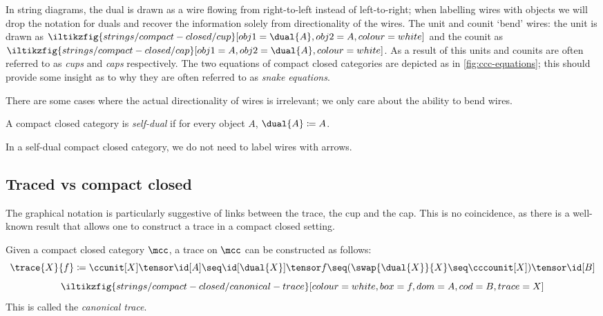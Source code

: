 In string diagrams, the dual is drawn as a wire flowing from right-to-left
instead of left-to-right; when labelling wires with objects we will drop the
notation for duals and recover the information solely from directionality of the
wires.
The unit and counit `bend' wires: the unit is drawn as \(
\iltikzfig{strings/compact-closed/cup}[obj1=\dual{A},obj2=A,colour=white]
\)
 and the counit as \(
\iltikzfig{strings/compact-closed/cap}[obj1=A,obj2=\dual{A},colour=white]
\).
As a result of this units and counits are often referred to as \emph{cups} and
\emph{caps} respectively.
The two equations of compact closed categories are depicted as in
\cref{fig:ccc-equations}; this should provide some insight as to why they are
often referred to as \emph{snake equations}.



There are some cases where the actual directionality of wires is irrelevant;
we only care about the ability to bend wires.

\begin{definition}
    A compact closed category is \emph{self-dual} if for every object \(A\),
    \(\dual{A} \coloneqq A\).
\end{definition}

In a self-dual compact closed category, we do not need to label wires with
arrows.

\subsection{Traced vs compact closed}

The graphical notation is particularly suggestive of links between the
trace, the cup and the cap.
This is no coincidence, as there is a well-known result that allows one to
construct a trace in a compact closed setting.

\begin{proposition}
    \label{prop:canonical-trace}
    Given a compact closed category \(\mcc\), a trace on \(\mcc\) can be
    constructed as follows: \[
        \trace{X}{f}
        \coloneqq
        \ccunit[X] \tensor \id[A]
        \seq
        \id[\dual{X}] \tensor f
        \seq
        (\swap{\dual{X}}{X} \seq \cccounit[X]) \tensor \id[B]
    \]
    \[
        \iltikzfig{strings/compact-closed/canonical-trace}[colour=white,box=f,dom=A,cod=B,trace=X]
    \]
    This is called the \emph{canonical trace}.
\end{proposition}

